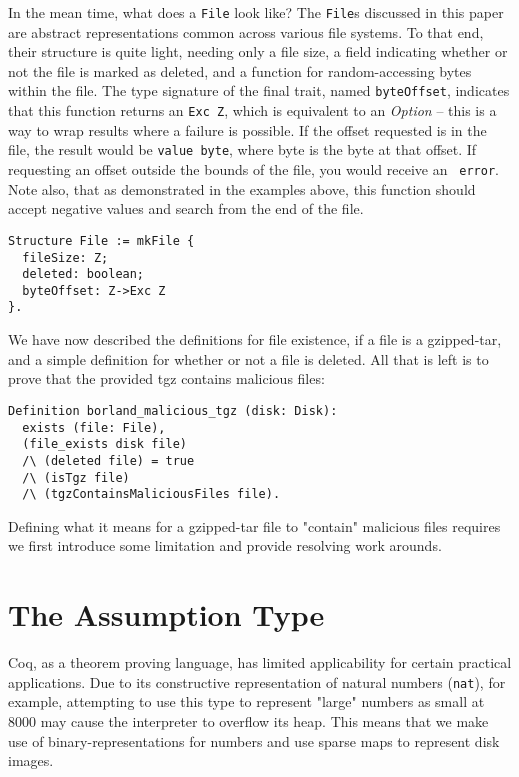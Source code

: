 \documentclass[nocopyrightspace]{sigplanconf}
\begin{document}
In the mean time, what does a {\tt File} look like? The {\tt File}s discussed
in this paper are abstract representations common across various file systems.
To that end, their structure is quite light, needing only a file size, a field
indicating whether or not the file is marked as deleted, and a function for
random-accessing bytes within the file. The type signature of the final trait,
named {\tt byteOffset}, indicates that this function returns an {\tt Exc Z},
which is equivalent to an {\it Option} -- this is a way to wrap results where
a failure is possible. If the offset requested is in the file, the result
would be {\tt value byte}, where byte is the byte at that offset. If
requesting an offset outside the bounds of the file, you would receive an {\tt
error}. Note also, that as demonstrated in the examples above, this function
should accept negative values and search from the end of the file.

\begin{lstlisting}
Structure File := mkFile {
  fileSize: Z;
  deleted: boolean;
  byteOffset: Z->Exc Z
}.
\end{lstlisting}

We have now described the definitions for file existence, if a file is a
gzipped-tar, and a simple definition for whether or not a file is deleted. All
that is left is to prove that the provided tgz contains malicious files:

\begin{lstlisting}
Definition borland_malicious_tgz (disk: Disk):
  exists (file: File),
  (file_exists disk file)
  /\ (deleted file) = true
  /\ (isTgz file)
  /\ (tgzContainsMaliciousFiles file).
\end{lstlisting}

Defining what it means for a gzipped-tar file to "contain" malicious files
requires we first introduce some limitation and provide resolving work
arounds.

\section{The Assumption Type}

Coq, as a theorem proving language, has limited applicability for certain
practical applications. Due to its constructive representation of natural
numbers ({\tt nat}), for example, attempting to use this type to represent
"large" numbers as small at 8000 may cause the interpreter to overflow its
heap. This means that we make use of binary-representations for numbers and
use sparse maps to represent disk images. 
\end{document}
